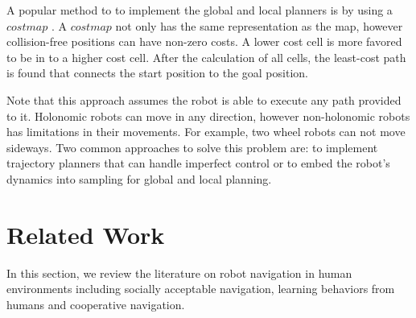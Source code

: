 A popular method to to implement the global and local planners is by using a $costmap$ . A $costmap$ not only has the same representation as the map, however collision-free positions can have non-zero costs. A lower cost cell is more favored to be in to a higher cost cell. After the calculation of all cells, the least-cost path is found that connects the start position to the goal position.

Note that this approach assumes the robot is able to execute any path provided to it. Holonomic robots can move in any direction, however non-holonomic robots has limitations in their movements. For example, two wheel robots can not move sideways. Two common approaches to solve this problem are: to implement trajectory planners that can handle imperfect control or to embed the robot's dynamics into sampling for global and local planning.

\section{Related Work}
\label{sec:navigation_related_work}

In this section, we review the literature on robot navigation in human environments including socially acceptable navigation, learning behaviors from humans and cooperative navigation.

